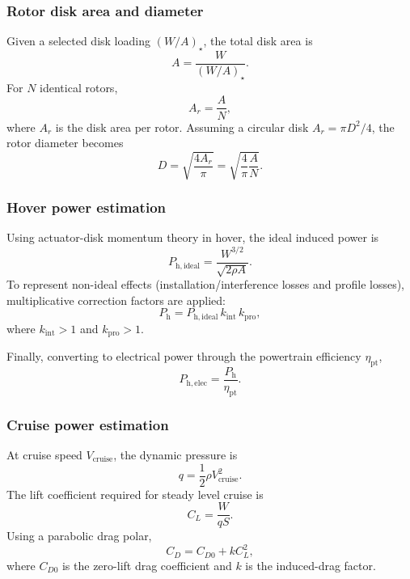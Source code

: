 \documentclass[11pt, a4paper]{article}
\begin{document}
\subsubsection{Rotor disk area and diameter}
Given a selected disk loading $(W/A)_\star$, the total disk area is
\begin{equation}
A=\frac{W}{(W/A)_\star}.
\end{equation}
For $N$ identical rotors,
\begin{equation}
A_r=\frac{A}{N},
\end{equation}
where $A_r$ is the disk area per rotor. Assuming a circular disk $A_r=\pi D^2/4$, the rotor diameter becomes
\begin{equation}
D=\sqrt{\frac{4A_r}{\pi}}
=
\sqrt{\frac{4}{\pi}\frac{A}{N}}.
\end{equation}

\subsubsection{Hover power estimation}
Using actuator-disk momentum theory in hover, the ideal induced power is
\begin{equation}
P_{\mathrm{h,ideal}}=\frac{W^{3/2}}{\sqrt{2\rho A}}.
\end{equation}
To represent non-ideal effects (installation/interference losses and profile losses), multiplicative correction factors are applied:
\begin{equation}
P_{\mathrm{h}} = P_{\mathrm{h,ideal}}\,k_\mathrm{int}\,k_\mathrm{pro},
\end{equation}
where $k_\mathrm{int}>1$ and $k_\mathrm{pro}>1$.

Finally, converting to electrical power through the powertrain efficiency $\eta_\mathrm{pt}$,
\begin{equation}
P_{\mathrm{h,elec}}=\frac{P_{\mathrm{h}}}{\eta_\mathrm{pt}}.
\end{equation}

\subsubsection{Cruise power estimation}
At cruise speed $V_\mathrm{cruise}$, the dynamic pressure is
\begin{equation}
q=\frac{1}{2}\rho V_\mathrm{cruise}^2.
\end{equation}
The lift coefficient required for steady level cruise is
\begin{equation}
C_L=\frac{W}{qS}.
\end{equation}
Using a parabolic drag polar,
\begin{equation}
C_D = C_{D0}+kC_L^2,
\end{equation}
where $C_{D0}$ is the zero-lift drag coefficient and $k$ is the induced-drag factor.
\end{document}
